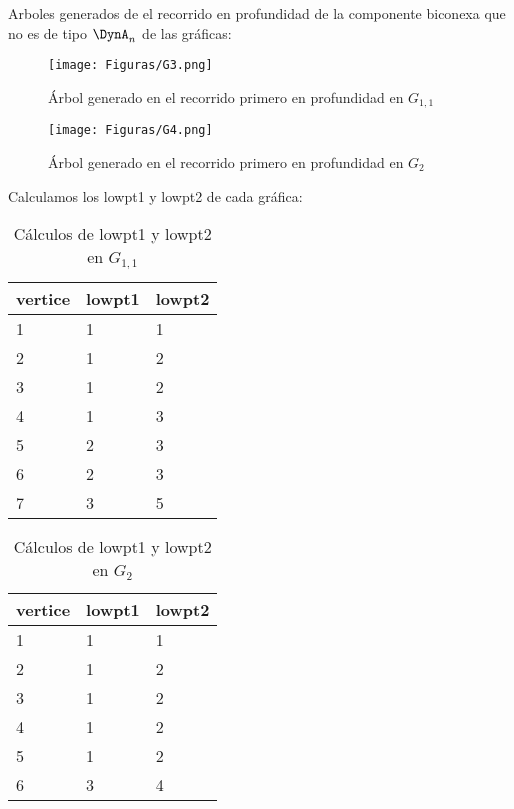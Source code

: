 Arboles generados de el recorrido en profundidad de la componente biconexa que no es de tipo $\DynA_{n}$ de las gráficas:
\begin{figure}[H]
\centering
\texttt{[image: Figuras/G3.png]}
\caption{Árbol generado en el recorrido primero en profundidad en $G_{1, 1}$}
\label{figura:recorridoG1}
\end{figure}

\begin{figure}[H]
\centering
\texttt{[image: Figuras/G4.png]}
\caption{Árbol generado en el recorrido primero en profundidad en $G_{2}$}
\label{figura:recorridoG2}
\end{figure}

Calculamos los lowpt1 y lowpt2 de cada gráfica:
\begin{table}[H]
\begin{center}
\begin{tabular}{lll}
\toprule
vertice & lowpt1 & lowpt2 \\
\midrule
      1 &      1 &      1 \\
      2 &      1 &      2 \\
      3 &      1 &      2 \\
      4 &      1 &      3 \\
      5 &      2 &      3 \\
      6 &      2 &      3 \\
      7 &      3 &      5 \\
\bottomrule
\end{tabular}
\caption{Cálculos de lowpt1 y lowpt2 en $G_{1,1}$}
\end{center}
\end{table}

\begin{table}[H]
\begin{center}
\begin{tabular}{lll}
\toprule
vertice & lowpt1 & lowpt2 \\
\midrule
      1 &      1 &      1 \\
      2 &      1 &      2 \\
      3 &      1 &      2 \\
      4 &      1 &      2 \\
      5 &      1 &      2 \\
      6 &      3 &      4 \\
\bottomrule
\end{tabular}
\caption{Cálculos de lowpt1 y lowpt2 en $G_{2}$}
\end{center}
\end{table}

